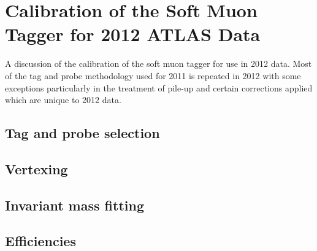 
\chapter{Calibration of the Soft Muon Tagger for 2012 ATLAS Data} \label{prt:calibration_smt_2012}
A discussion of the calibration of the soft muon tagger for use in 2012 data.
Most of the tag and probe methodology used for 2011 is repeated in 2012 with some 
exceptions particularly in the treatment of pile-up and certain corrections applied
which are unique to 2012 data.

\section{Tag and probe selection} \label{sec:selection_criteria}
\section{Vertexing} \label{sec:vertexing}
\section{Invariant mass fitting} \label{sec:fitting}
\section{Efficiencies} \label{sec:efficiencies}
